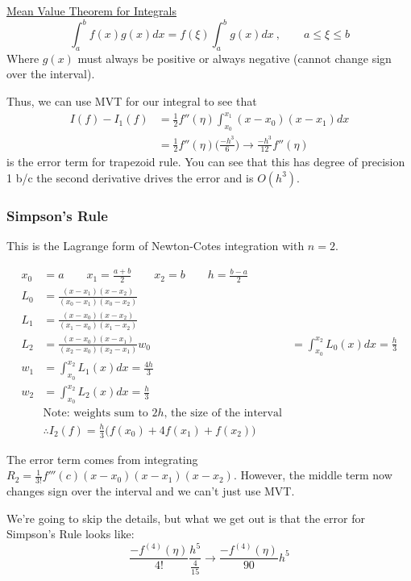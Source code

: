 \documentclass[12pt]{article}
\begin{document}
\underline{Mean Value Theorem for Integrals}\\
\[\int_a^b f(x)g(x)dx = f(\xi) \int_a^b g(x)dx\:, \qquad a\leq \xi \leq b\]
Where $g(x)$ must always be positive or always negative (cannot change sign over the interval).

Thus, we can use MVT for our integral to see that
\begin{align*}
I(f) - I_1(f) &= \frac{1}{2}f''(\eta) \int_{x_0}^{x_1} (x-x_0)(x-x_1) dx \\
&= \frac{1}{2}f''(\eta) \bigl(\frac{-h^3}{6}\bigr) \rightarrow \boxed{\frac{-h^3}{12}f''(\eta)}
\end{align*}
is the error term for trapezoid rule. You can see that this has degree of precision 1 b/c the second derivative drives the error and is $O(h^3)$.


\vspace*{-1em}
\subsubsection*{Simpson's Rule}
This is the Lagrange form of Newton-Cotes integration with $n=2$.

\begin{align*}
x_0 &= a \qquad x_1 = \frac{a+b}{2} \qquad x_2=b \qquad h=\frac{b-a}{2}\\
%
L_0 &= \frac{(x-x_1)(x-x_2)}{(x_0-x_1)(x_0-x_2)}\\
L_1 &= \frac{(x-x_0)(x-x_2)}{(x_1-x_0)(x_1-x_2)}\\
L_2 &= \frac{(x-x_0)(x-x_1)}{(x_2-x_0)(x_2-x_1)}
%
w_0 &= \int_{x_0}^{x_2} L_0(x)dx = \frac{h}{3}\\
w_1 &= \int_{x_0}^{x_2} L_1(x)dx = \frac{4h}{3}\\
w_2 &= \int_{x_0}^{x_2} L_2(x)dx = \frac{h}{3}\\
&\text{Note: weights sum to }2h\text{, the size of the interval}\nonumber\\
%
&\therefore I_2(f) = \frac{h}{3}\bigl(f(x_0) + 4f(x_1) + f(x_2)\bigr) 
\end{align*}
 
The error term comes from integrating $R_2 = \frac{1}{3!}f'''(c)(x-x_0)(x-x_1)(x-x_2)$. However, the middle term now changes sign over the interval and we can't just use MVT.

We're going to skip the details, but what we get out is that the error for Simpson's Rule looks like:
\[\frac{-f^{(4)}(\eta)}{4!}\frac{h^5}{\frac{4}{15}} \rightarrow \boxed{\frac{-f^{(4)}(\eta)}{90}h^5}\]
\end{document}

